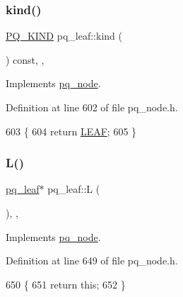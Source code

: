 \subsubsection{\texorpdfstring{kind()}{kind()}}
{\footnotesize\ttfamily \mbox{\hyperlink{classpq__node_a96827bdca8bf81d20213405dd27f8fa6}{P\+Q\+\_\+\+K\+I\+ND}} pq\+\_\+leaf\+::kind (\begin{DoxyParamCaption}{ }\end{DoxyParamCaption}) const\hspace{0.3cm}{\ttfamily [inline]}, {\ttfamily [private]}, {\ttfamily [virtual]}}



Implements \mbox{\hyperlink{classpq__node_aa9873c0cfad88bc4404857ce57d422e4}{pq\+\_\+node}}.



Definition at line 602 of file pq\+\_\+node.\+h.


\begin{DoxyCode}
603     \{
604     \textcolor{keywordflow}{return} \mbox{\hyperlink{classpq__node_a96827bdca8bf81d20213405dd27f8fa6a80289f856abee0f9cb17852111ba9991}{LEAF}};
605     \}
\end{DoxyCode}
\mbox{\label{classpq__leaf_a0445b0e4084239950416c8643c3fd69d}} 
\subsubsection{\texorpdfstring{L()}{L()}}
{\footnotesize\ttfamily \mbox{\hyperlink{classpq__leaf}{pq\+\_\+leaf}}$\ast$ pq\+\_\+leaf\+::L (\begin{DoxyParamCaption}{ }\end{DoxyParamCaption})\hspace{0.3cm}{\ttfamily [inline]}, {\ttfamily [private]}, {\ttfamily [virtual]}}



Implements \mbox{\hyperlink{classpq__node_a805b6ef48c847380b47c8ba882ed4ee2}{pq\+\_\+node}}.



Definition at line 649 of file pq\+\_\+node.\+h.


\begin{DoxyCode}
650     \{
651     \textcolor{keywordflow}{return} \textcolor{keyword}{this};
652     \}
\end{DoxyCode}
\mbox{\label{classpq__leaf_a26b5bc998de77c10430b9406ed06f2ce}} 
